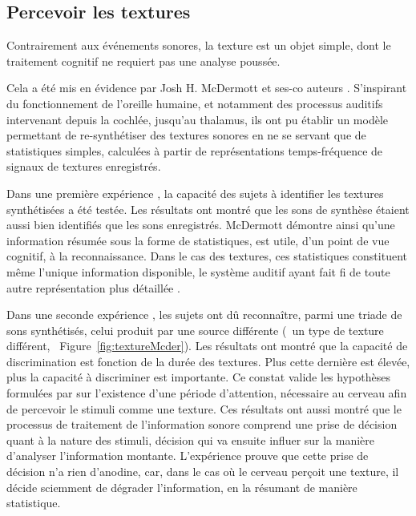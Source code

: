 \subsection{Percevoir les textures}
\label{sec:ch3_texturePerception}

Contrairement aux événements sonores, la texture est un objet simple, dont le traitement cognitif ne requiert pas une analyse poussée. 

Cela a été mis en évidence par Josh H. McDermott et ses-co auteurs \citep{mcdermott2011sound,mcdermott2013summary}. S'inspirant du fonctionnement de l'oreille humaine, et notamment des processus auditifs intervenant depuis la cochlée, jusqu'au thalamus, ils ont pu établir un modèle permettant de re-synthétiser des textures sonores en ne se servant que de statistiques simples, calculées à partir de représentations temps-fréquence de signaux de textures enregistrés. 

Dans une première expérience \citep{mcdermott2011sound}, la capacité des sujets à identifier les textures synthétisées a été testée. Les résultats ont montré que les sons de synthèse étaient aussi bien identifiés que les sons enregistrés. McDermott démontre ainsi qu'une information résumée sous la forme de statistiques, est utile, d'un point de vue cognitif, à la reconnaissance. Dans le cas des textures, ces statistiques constituent même l'unique information disponible, le système auditif ayant fait fi de toute autre représentation plus détaillée \citep{nelken2013ear}.

Dans une seconde expérience \citep{mcdermott2013summary}, les sujets ont dû reconnaître, parmi une triade de sons synthétisés, celui produit par une source différente (\ie~un type de texture différent, \cf~Figure~\ref{fig:textureMcder}). Les résultats ont montré que la capacité de discrimination est fonction de la durée des textures. Plus cette dernière est élevée, plus la capacité à discriminer est importante. Ce constat valide les hypothèses formulées par \citep{saint1995classification} sur l'existence d'une période d'attention, nécessaire au cerveau afin de percevoir le stimuli comme une texture. Ces résultats ont aussi montré que le processus de traitement de l'information sonore comprend une prise de décision quant à la nature des stimuli, décision qui va  ensuite influer sur la manière d'analyser l'information montante. L'expérience prouve que cette prise de décision n'a rien d'anodine, car, dans le cas où le cerveau perçoit une texture, il décide sciemment de dégrader l'information, en la résumant de manière statistique.

